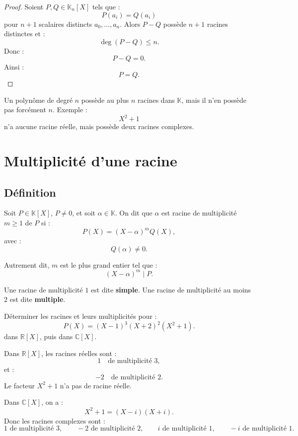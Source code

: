 \documentclass[11pt,a4paper]{article}
\newcommand{\K}{\mathbb K}
\newcommand{\R}{\mathbb R}
\newcommand{\C}{\mathbb C}
\begin{document}
\begin{proof}
Soient \(P,Q\in\K_n[X]\) tels que :
\[
P(a_i)=Q(a_i)
\]
pour \(n+1\) scalaires distincts \(a_0,\dots,a_n\).  
Alors \(P-Q\) possède \(n+1\) racines distinctes et :
\[
\deg(P-Q)\leq n.
\]
Donc :
\[
P-Q=0.
\]
Ainsi :
\[
P=Q.
\]
\end{proof}

\begin{erreurbox}
Un polynôme de degré \(n\) possède au plus \(n\) racines dans \(\K\), mais il n'en possède pas forcément \(n\).  
Exemple :
\[
X^2+1
\]
n'a aucune racine réelle, mais possède deux racines complexes.
\end{erreurbox}

\section{Multiplicité d'une racine}

\subsection{Définition}

\begin{definitionbox}
Soit \(P\in\K[X]\), \(P\neq0\), et soit \(\alpha\in\K\).  
On dit que \(\alpha\) est racine de multiplicité \(m\geq1\) de \(P\) si :
\[
P(X)=(X-\alpha)^mQ(X),
\]
avec :
\[
Q(\alpha)\neq0.
\]
\end{definitionbox}

Autrement dit, \(m\) est le plus grand entier tel que :
\[
(X-\alpha)^m\mid P.
\]

\begin{definitionbox}
Une racine de multiplicité \(1\) est dite \textbf{simple}.  
Une racine de multiplicité au moins \(2\) est dite \textbf{multiple}.
\end{definitionbox}

\begin{exercicebox}[Multiplicités]
Déterminer les racines et leurs multiplicités pour :
\[
P(X)=(X-1)^3(X+2)^2(X^2+1).
\]
dans \(\R[X]\), puis dans \(\C[X]\).
\end{exercicebox}

\begin{correctionbox}
Dans \(\R[X]\), les racines réelles sont :
\[
1 \quad\text{de multiplicité }3,
\]
et :
\[
-2 \quad\text{de multiplicité }2.
\]
Le facteur \(X^2+1\) n'a pas de racine réelle.

Dans \(\C[X]\), on a :
\[
X^2+1=(X-i)(X+i).
\]
Donc les racines complexes sont :
\[
1 \text{ de multiplicité }3,
\qquad
-2 \text{ de multiplicité }2,
\qquad
i \text{ de multiplicité }1,
\qquad
-i \text{ de multiplicité }1.
\]
\end{correctionbox}
\end{document}
